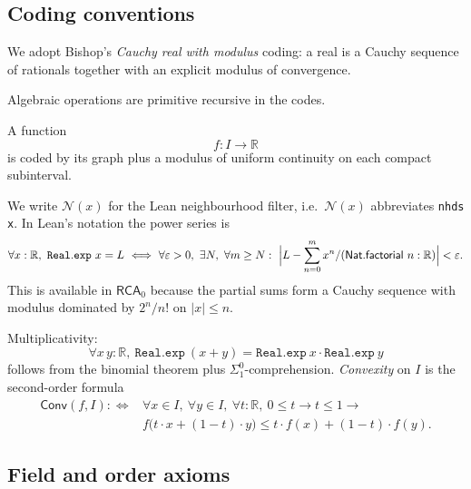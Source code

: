 \documentclass[11pt,reqno]{amsart}
\makeatletter
\providecommand{\R}{\mathbb{R}}
\theoremstyle{redplain}
\renewenvironment{quotation}
{\list{}{\listparindent\z@
		\itemindent\z@
		\rightmargin\leftmargin
		\parsep\z@}	\item\relax}
{\endlist}
\numberwithin{equation}{section}
\makeatother
\begin{document}
\subsection{Coding conventions}

\label{sec:convexity-coding}

\begin{quotation}
\noindent We adopt Bishop's \emph{Cauchy real with modulus} coding: a real
is a Cauchy sequence of rationals together with an explicit modulus of
convergence.

Algebraic operations are primitive recursive in the codes.

\noindent A function%
\begin{equation*}
f:I\rightarrow \R
\end{equation*}%
is coded by its graph plus a modulus of uniform continuity on each compact
subinterval.

\noindent We write $\mathcal{N}(x)$ for the Lean neighbourhood filter, i.e.\ 
$\mathcal{N}(x)$ abbreviates \texttt{nhds x}. \noindent In Lean's notation
the power series is 
\begin{equation*}
\forall x:\mathbb{R},\ \mathtt{Real.exp}\ x=L\ \Longleftrightarrow \ \forall
\varepsilon >0,\ \exists N,\ \forall m\geq N:\ \Bigl|L-\sum_{n=0}^{m}x^{n}/(%
\mathsf{Nat.factorial}\ n:\mathbb{R})\Bigr|<\varepsilon .
\end{equation*}%
This is available in $\mathsf{RCA}_{0}$ because the partial sums form a
Cauchy sequence with modulus dominated by $2^{n}/n!$ on $|x|\leq n$.

Multiplicativity: 
\begin{equation*}
\forall x\,y:\mathbb{R},\ \mathtt{Real.exp}\ (x+y)=\mathtt{Real.exp}\ x\cdot 
\mathtt{Real.exp}\ y
\end{equation*}%
follows from the binomial theorem plus $\Sigma _{1}^{0}$-comprehension.
\noindent \emph{Convexity} on $I$ is the second-order formula 
\begin{equation*}
\begin{aligned} \mathsf{Conv}(f, I):\iff {} & \forall x \in I,\ \forall y
\in I,\  \forall t : \mathbb{R},\ 0 \le t \to t \le 1 \to {}\\ & f\bigl(t
\cdot x + (1 - t) \cdot y\bigr) \le t \cdot f(x) + (1 - t) \cdot f(y).
\end{aligned}
\end{equation*}
\end{quotation}

\subsection{Field and order axioms}
\end{document}
